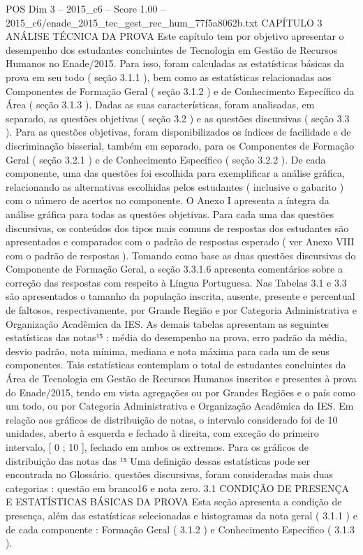 \begin{textsample}{POS Dim 3 – 2015\_c6 – Score 1.00 – 2015\_c6/enade\_2015\_tec\_gest\_rec\_hum\_77f5a8062b.txt}  \label{ex:f3_pos_217}
CAPÍTULO 3 ANÁLISE TÉCNICA DA PROVA Este capítulo tem por objetivo apresentar o desempenho dos estudantes concluintes de Tecnologia em Gestão de Recursos Humanos no Enade/2015.
Para isso, foram calculadas as estatísticas básicas da prova em seu todo ( seção 3.1.1 ), bem como as estatísticas relacionadas aos Componentes de Formação Geral ( seção 3.1.2 ) e de Conhecimento Específico da Área ( seção 3.1.3 ).
Dadas as suas características, foram analisadas, em separado, as questões objetivas ( seção 3.2 ) e as questões discursivas ( seção 3.3 ).
Para as questões objetivas, foram disponibilizados os índices de facilidade e de discriminação bisserial, também em separado, para os Componentes de Formação Geral ( seção 3.2.1 ) e de Conhecimento Específico ( seção 3.2.2 ).
De cada componente, uma das questões foi escolhida para exemplificar a análise gráfica, relacionando as alternativas escolhidas pelos estudantes ( inclusive o gabarito ) com o número de acertos no componente.
O Anexo I apresenta a íntegra da análise gráfica para todas as questões objetivas.
Para cada uma das questões discursivas, os conteúdos dos tipos mais comuns de respostas dos estudantes são apresentados e comparados com o padrão de respostas esperado ( ver Anexo VIII com o padrão de respostas ).
Tomando como base as duas questões discursivas do Componente de Formação Geral, a seção 3.3.1.6 apresenta comentários sobre a correção das respostas com respeito à Língua Portuguesa.
Nas Tabelas 3.1 e 3.3 são apresentados o tamanho da população inscrita, ausente, presente e percentual de faltosos, respectivamente, por Grande Região e por Categoria Administrativa e Organização Acadêmica da IES.
As demais tabelas apresentam as seguintes estatísticas das notas¹⁵ : média do desempenho na prova, erro padrão da média, desvio padrão, nota mínima, mediana e nota máxima para cada um de seus componentes.
Tais estatísticas contemplam o total de estudantes concluintes da Área de Tecnologia em Gestão de Recursos Humanos inscritos e presentes à prova do Enade/2015, tendo em vista agregações ou por Grandes Regiões e o país como um todo, ou por Categoria Administrativa e Organização Acadêmica da IES.
Em relação aos gráficos de distribuição de notas, o intervalo considerado foi de 10 unidades, aberto à esquerda e fechado à direita, com exceção do primeiro intervalo, [ 0 ; 10 ], fechado em ambos os extremos.
Para os gráficos de distribuição das notas das ¹⁵ Uma definição dessas estatísticas pode ser encontrada no Glossário. questões discursivas, foram consideradas mais duas categorias : questão em branco16 e nota zero. 3.1 CONDIÇÃO DE PRESENÇA E ESTATÍSTICAS BÁSICAS DA PROVA Esta seção apresenta a condição de presença, além das estatísticas selecionadas e histogramas da nota geral ( 3.1.1 ) e de cada componente : Formação Geral ( 3.1.2 ) e Conhecimento Específico ( 3.1.3 ).

\end{textsample}
